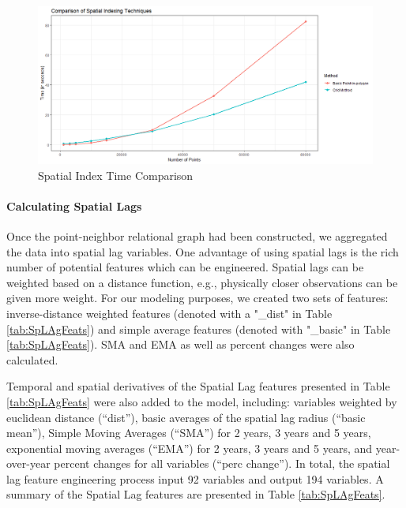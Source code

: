 \documentclass[12pt,]{article}
\let\oldparagraph\paragraph
\renewcommand{\paragraph}[1]{\oldparagraph{#1}\mbox{}}
\begin{document}
\begin{figure}[H]
\includegraphics[width=1\linewidth]{Sections/tables and figures/Example Spatial Indexing Techniques} \caption{Spatial Index Time Comparison}\label{fig:Spatial Indexing Process}
\end{figure}

\hypertarget{calculating-spatial-lags}{%
\paragraph{Calculating Spatial Lags}\label{calculating-spatial-lags}}

Once the point-neighbor relational graph had been constructed, we
aggregated the data into spatial lag variables. One advantage of using
spatial lags is the rich number of potential features which can be
engineered. Spatial lags can be weighted based on a distance function,
e.g., physically closer observations can be given more weight. For our
modeling purposes, we created two sets of features: inverse-distance
weighted features (denoted with a "\_dist" in Table
\ref{tab:SpLAgFeats}) and simple average features (denoted with
"\_basic" in Table \ref{tab:SpLAgFeats}). SMA and EMA as well as percent
changes were also calculated.

Temporal and spatial derivatives of the Spatial Lag features presented
in Table \ref{tab:SpLAgFeats} were also added to the model, including:
variables weighted by euclidean distance (``dist''), basic averages of
the spatial lag radius (``basic mean''), Simple Moving Averages
(``SMA'') for 2 years, 3 years and 5 years, exponential moving averages
(``EMA'') for 2 years, 3 years and 5 years, and year-over-year percent
changes for all variables (``perc change''). In total, the spatial lag
feature engineering process input 92 variables and output 194 variables.
A summary of the Spatial Lag features are presented in Table
\ref{tab:SpLAgFeats}.
\end{document}
